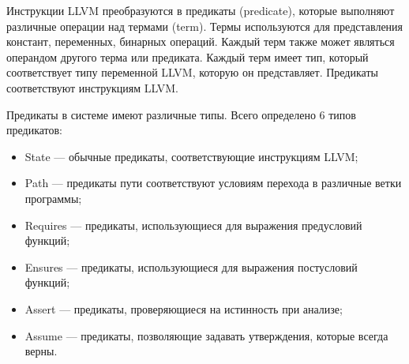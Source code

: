 Инструкции LLVM преобразуются в предикаты (predicate), которые выполняют 
различные операции над термами (term). Термы используются для представления 
констант, переменных, бинарных операций. Каждый терм также может являться 
операндом другого терма или предиката. Каждый терм имеет тип, который 
соответствует типу переменной LLVM, которую он представляет. Предикаты 
соответствуют инструкциям LLVM.
    
Предикаты в системе имеют различные типы. Всего определено 6 типов предикатов:
\begin{itemize}
\item State --- обычные предикаты, соответствующие инструкциям LLVM;
\item Path --- предикаты пути соответствуют условиям перехода в различные 
ветки программы;
\item Requires --- предикаты, использующиеся для выражения предусловий функций;
\item Ensures --- предикаты, использующиеся для выражения постусловий функций;
\item Assert --- предикаты, проверяющиеся на истинность при анализе;
\item Assume --- предикаты, позволяющие задавать утверждения, которые всегда верны.
\end{itemize}


